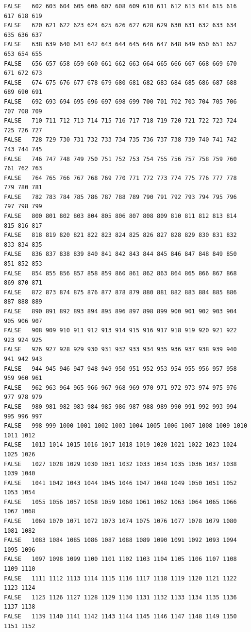 \documentclass[]{article}
\begin{document}
\begin{verbatim}
FALSE   602 603 604 605 606 607 608 609 610 611 612 613 614 615 616 617 618 619
FALSE   620 621 622 623 624 625 626 627 628 629 630 631 632 633 634 635 636 637
FALSE   638 639 640 641 642 643 644 645 646 647 648 649 650 651 652 653 654 655
FALSE   656 657 658 659 660 661 662 663 664 665 666 667 668 669 670 671 672 673
FALSE   674 675 676 677 678 679 680 681 682 683 684 685 686 687 688 689 690 691
FALSE   692 693 694 695 696 697 698 699 700 701 702 703 704 705 706 707 708 709
FALSE   710 711 712 713 714 715 716 717 718 719 720 721 722 723 724 725 726 727
FALSE   728 729 730 731 732 733 734 735 736 737 738 739 740 741 742 743 744 745
FALSE   746 747 748 749 750 751 752 753 754 755 756 757 758 759 760 761 762 763
FALSE   764 765 766 767 768 769 770 771 772 773 774 775 776 777 778 779 780 781
FALSE   782 783 784 785 786 787 788 789 790 791 792 793 794 795 796 797 798 799
FALSE   800 801 802 803 804 805 806 807 808 809 810 811 812 813 814 815 816 817
FALSE   818 819 820 821 822 823 824 825 826 827 828 829 830 831 832 833 834 835
FALSE   836 837 838 839 840 841 842 843 844 845 846 847 848 849 850 851 852 853
FALSE   854 855 856 857 858 859 860 861 862 863 864 865 866 867 868 869 870 871
FALSE   872 873 874 875 876 877 878 879 880 881 882 883 884 885 886 887 888 889
FALSE   890 891 892 893 894 895 896 897 898 899 900 901 902 903 904 905 906 907
FALSE   908 909 910 911 912 913 914 915 916 917 918 919 920 921 922 923 924 925
FALSE   926 927 928 929 930 931 932 933 934 935 936 937 938 939 940 941 942 943
FALSE   944 945 946 947 948 949 950 951 952 953 954 955 956 957 958 959 960 961
FALSE   962 963 964 965 966 967 968 969 970 971 972 973 974 975 976 977 978 979
FALSE   980 981 982 983 984 985 986 987 988 989 990 991 992 993 994 995 996 997
FALSE   998 999 1000 1001 1002 1003 1004 1005 1006 1007 1008 1009 1010 1011 1012
FALSE   1013 1014 1015 1016 1017 1018 1019 1020 1021 1022 1023 1024 1025 1026
FALSE   1027 1028 1029 1030 1031 1032 1033 1034 1035 1036 1037 1038 1039 1040
FALSE   1041 1042 1043 1044 1045 1046 1047 1048 1049 1050 1051 1052 1053 1054
FALSE   1055 1056 1057 1058 1059 1060 1061 1062 1063 1064 1065 1066 1067 1068
FALSE   1069 1070 1071 1072 1073 1074 1075 1076 1077 1078 1079 1080 1081 1082
FALSE   1083 1084 1085 1086 1087 1088 1089 1090 1091 1092 1093 1094 1095 1096
FALSE   1097 1098 1099 1100 1101 1102 1103 1104 1105 1106 1107 1108 1109 1110
FALSE   1111 1112 1113 1114 1115 1116 1117 1118 1119 1120 1121 1122 1123 1124
FALSE   1125 1126 1127 1128 1129 1130 1131 1132 1133 1134 1135 1136 1137 1138
FALSE   1139 1140 1141 1142 1143 1144 1145 1146 1147 1148 1149 1150 1151 1152

\end{verbatim}
\end{document}
